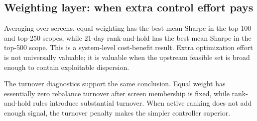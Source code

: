\documentclass[11pt,a4paper]{article}
\begin{document}
\subsection{Weighting layer: when extra control effort pays}
Averaging over screens, equal weighting has the best mean Sharpe in the top-100 and top-250 scopes, while 21-day rank-and-hold has the best mean Sharpe in the top-500 scope. This is a system-level cost-benefit result. Extra optimization effort is not universally valuable; it is valuable when the upstream feasible set is broad enough to contain exploitable dispersion.
\begin{table}[H]
\centering
\caption{Controller ablation: best weighting rule averaged over screens.}
\label{tab:controller_ablation_math}
\small
{}
\end{table}
The turnover diagnostics support the same conclusion. Equal weight has essentially zero rebalance turnover after screen membership is fixed, while rank-and-hold rules introduce substantial turnover. When active ranking does not add enough signal, the turnover penalty makes the simpler controller superior.
\end{document}
